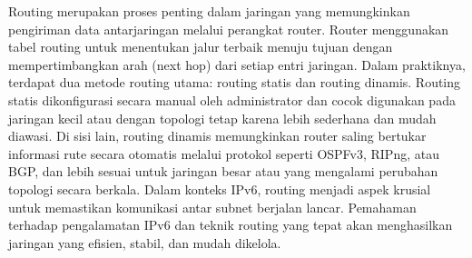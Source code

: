 Routing merupakan proses penting dalam jaringan yang memungkinkan pengiriman data antarjaringan melalui perangkat router. Router menggunakan tabel routing untuk menentukan jalur terbaik menuju tujuan dengan mempertimbangkan arah (next hop) dari setiap entri jaringan. Dalam praktiknya, terdapat dua metode routing utama: routing statis dan routing dinamis. Routing statis dikonfigurasi secara manual oleh administrator dan cocok digunakan pada jaringan kecil atau dengan topologi tetap karena lebih sederhana dan mudah diawasi. Di sisi lain, routing dinamis memungkinkan router saling bertukar informasi rute secara otomatis melalui protokol seperti OSPFv3, RIPng, atau BGP, dan lebih sesuai untuk jaringan besar atau yang mengalami perubahan topologi secara berkala. Dalam konteks IPv6, routing menjadi aspek krusial untuk memastikan komunikasi antar subnet berjalan lancar. Pemahaman terhadap pengalamatan IPv6 dan teknik routing yang tepat akan menghasilkan jaringan yang efisien, stabil, dan mudah dikelola.

